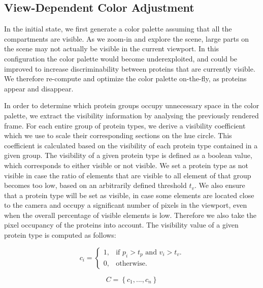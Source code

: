 \documentclass[review,journal]{vgtc}         %
\begin{document}
	
	\subsection{View-Dependent Color Adjustment}
	\label{sec:dynamic}
	
	In the initial state, we first generate a color palette assuming that all the compartments are visible.
	As we zoom-in and explore the scene, large parts on the scene may not actually be visible in the current viewport.
	In this configuration the color palette would become underexploited, and could be improved to increase discriminability between proteins that are currently visible. 
	We therefore re-compute and optimize the color palette on-the-fly, as proteins appear and disappear.
			 
	In order to determine which protein groups occupy unnecessary space in the color palette, we extract the visibility information by analysing the previously rendered frame.
	For each entire group of protein types, we derive a visibility coefficient which we use to scale their corresponding sections on the hue circle. 
	This coefficient is calculated based on the visibility of each protein type contained in a given group.
	The visibility of a given protein type is defined as a boolean value, which corresponds to either visible or not visible.
	We set a protein type as not visible in case the ratio of elements that are visible to all element of that group becomes too low, based on an arbitrarily defined threshold $t_v$.
	We also ensure that a protein type will be set as visible, in case some elements are located close to the camera and occupy a significant number of pixels in the viewport, even when the overall percentage of visible elements is low.
	Therefore we also take the pixel occupancy of the proteins into account.
	The visibility value of a given protein type is computed as follows:
	
	\begin{equation}
	c_{i}=\begin{cases}
	1, & \text{if $p_{i}>t_{p}$ and $v_{i}>t_{v}$}.\\
	0, & \text{otherwise}.
	\end{cases}
	\end{equation}
	
	\begin{equation}
	C = \left\lbrace c_{1}, ... , c_{n} \right\rbrace 
	\end{equation}
	
\end{document}
